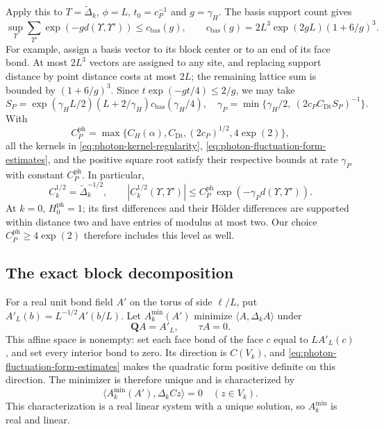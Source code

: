 Apply this to $T=\widetilde\Delta_k$, $\phi=L$,
$t_0=c_P^{-1}$ and $g=\gamma_H$. The basis support count gives
\[
 \sup_\Upsilon\sum_{\Upsilon'}\exp(-g d(\Upsilon,\Upsilon'))
       \le c_{\mathrm{bas}}(g),\qquad
 c_{\mathrm{bas}}(g)=2L^3\exp(2gL)(1+6/g)^3.
\]
For example, assign a basis vector to its block center or to an
end of its face bond. At most $2L^3$ vectors are assigned to any
site, and replacing support distance by point distance costs at
most $2L$; the remaining lattice sum is bounded by $(1+6/g)^3$.
Since $t\exp(-gt/4)\le2/g$, we may take
\[
 S_P=\exp(\gamma_HL/2)(L+2/\gamma_H)
                          c_{\mathrm{bas}}(\gamma_H/4),
 \quad
 \gamma_P=\min\{\gamma_H/2,\ (2c_PC_{\mathrm{Dt}}S_P)^{-1}\}.
\]
With
\[
 C_P^{\mathrm{ph}}=\max\{C_H(\alpha),C_{\mathrm{Dt}},(2c_P)^{1/2},4\exp(2)\},
\]
all the kernels in \eqref{eq:photon-kernel-regularity},
\eqref{eq:photon-fluctuation-form-estimates}, and the positive
square root satisfy their respective bounds at rate $\gamma_P$
with constant $C_P^{\mathrm{ph}}$. In particular,
\begin{equation}\label{eq:photon-square-root-decay}
 C_k^{1/2}=\widetilde\Delta_k^{-1/2},\qquad
 |C_k^{1/2}(\Upsilon,\Upsilon')|
                  \le C_P^{\mathrm{ph}}\exp(-\gamma_Pd(\Upsilon,\Upsilon')).
\end{equation}
At $k=0$, $H_0^{\mathrm{ph}}=1$; its first differences and their
H\"older differences are supported within distance two and have
entries of modulus at most two. Our choice $C_P^{\mathrm{ph}}\ge4\exp(2)$
therefore includes this level as well.

\subsection{The exact block decomposition}
\label{subsec:photon-block-decomposition}

For a real unit bond field $A'$ on the torus of side $\ell/L$,
put $A'_L(b)=L^{-1/2}A'(b/L)$. Let $A_k^{\min}(A')$ minimize
$\langle A,\Delta_kA\rangle$ under
\[
 \mathbf QA=A'_L,\qquad \tau A=0.
\]
This affine space is nonempty: set each face bond of the face $c$
equal to $L A'_L(c)$, and set every interior bond to zero.
Its direction is $C(V_k)$, and
\eqref{eq:photon-fluctuation-form-estimates} makes the quadratic
form positive definite on this direction. The minimizer is
therefore unique and is characterized by
\begin{equation}\label{eq:photon-block-minimizer-orthogonality}
 \langle A_k^{\min}(A'),\Delta_kCz\rangle=0
                    \quad(z\in V_k).
\end{equation}
This characterization is a real linear system with a unique
solution, so $A_k^{\min}$ is real and linear.

